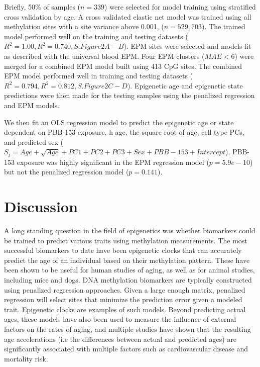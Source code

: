 \documentclass{article}
\begin{document}
{\begin{linenumbers}
Briefly, 50\% of samples ($n=339$) were selected for model training using stratified cross validation by age. A 
cross validated elastic net model was trained using all methylation sites with a site variance above 0.001, 
($n=529,703$). The trained model performed well on the training and testing datasets 
($R^2 = 1.00, R^2 = 0.740, S.Figure 2 A-B$). EPM sites were selected and models fit as described with the universal 
blood EPM. Four EPM clusters ($MAE < 6$) were merged for a combined EPM model built using 413 CpG sites. The 
combined EPM model performed well in training and testing datasets ($R^2 = 0.794, R^2 = 0.812, S.Figure 2 C-D$). 
Epigenetic age and epigenetic state predictions were then made for the testing samples using the penalized 
regression and EPM models. 

We then fit an OLS regression model to predict the epigenetic age or state dependent on  PBB-153 exposure, h age, the 
square root of age, cell type PCs, and predicted sex 
($S_j  = Age + \sqrt{Age} + PC1 + PC2 + PC3 + Sex + PBB-153 + Intercept$). PBB-153 exposure was highly significant in 
the EPM regression model ($p=5.9e-10$) but not the penalized regression model ($p=0.141$). 

\section{Discussion}

A long standing question in the field of epigenetics was whether biomarkers could be trained to predict various 
traits using methylation measurements.  The most successful biomarkers to date have been epigenetic clocks that can 
accurately predict the age of an individual based on their methylation pattern. These have been shown to be useful for 
human studies of aging, as well as for animal studies, including mice\cite{Thompson2018-rh} and dogs\cite{Thompson2017-cl}.  
DNA methylation biomarkers are typically constructed using penalized regression approaches.  Given a large enough matrix, 
penalized regression will select sites that minimize the prediction error given a modeled trait. Epigenetic clocks 
are examples of such models.  Beyond predicting actual ages, these models have also been used to measure the influence 
of external factors on the rates of aging, and multiple studies have shown that the resulting age accelerations 
(i.e the differences between actual and predicted ages) are significantly associated with multiple factors such as 
cardiovascular disease\cite{Huang2019-hf} and mortality risk\cite{Marioni2015-sn,Perna2016-pi}.


\end{linenumbers}}
\end{document}
